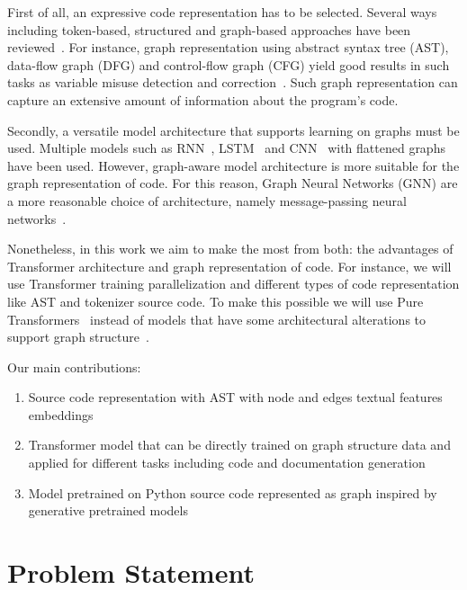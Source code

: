 \documentclass[sigplan,screen,anonymous,natbib=false]{acmart}
\begin{document}
First of all, an expressive code representation has to be selected. 
Several ways including token-based, structured and graph-based approaches have been reviewed~\cite{sm_avdoshin_code_2022}.
For instance, graph representation using abstract syntax tree (AST), data-flow graph (DFG) and control-flow graph (CFG) 
yield good results in such tasks as variable misuse detection and correction~\cite{allamanis_learning_2017}.
Such graph representation can capture an extensive amount of information about the program’s code.

Secondly, a versatile model architecture that supports learning on graphs must be used. 
Multiple models such as RNN~\cite{white_deep_2016}, LSTM~\cite{wei_supervised_2017} and CNN~\cite{mou_convolutional_2016} with flattened graphs have been used.
However, graph-aware model architecture is more suitable for the graph representation of code. 
For this reason, Graph Neural Networks (GNN) are a more reasonable choice of architecture, 
namely message-passing neural networks~\cite{allamanis_learning_2017}.

Nonetheless, in this work we aim to make the most from both: the advantages of Transformer architecture and graph representation of code. 
For instance, we will use Transformer training parallelization and different types of code representation like AST and tokenizer source code.
To make this possible we will use Pure Transformers~\cite{kim_pure_2022} instead of models that have some architectural alterations to support graph structure~\cite{kreuzer_rethinking_2021,dwivedi_generalization_2021,ying_transformers_2021}.

Our main contributions:
\begin{enumerate}
    \item Source code representation with AST with node and edges textual features embeddings
    \item Transformer model that can be directly trained on graph structure data and applied for different tasks including code and documentation generation
    \item Model pretrained on Python source code represented as graph inspired by generative pretrained models~\cite{radford_language_2019,brown_language_2020}
\end{enumerate}

\section{Problem Statement}\label{sec:problem-statement}
\end{document}
